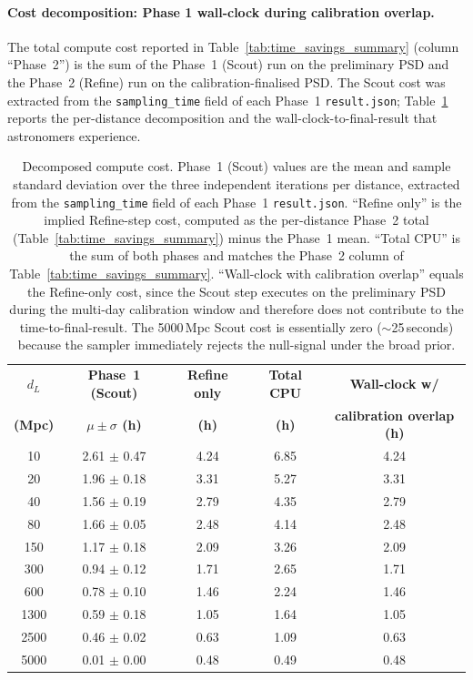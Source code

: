 \documentclass[12pt]{article}
\begin{document}
\paragraph{Cost decomposition: Phase 1 wall-clock during calibration overlap.}
The total compute cost reported in Table~\ref{tab:time_savings_summary} (column ``Phase~2'') is the sum of the Phase~1 (Scout) run on the preliminary PSD and the Phase~2 (Refine) run on the calibration-finalised PSD. The Scout cost was extracted from the \texttt{sampling\_time} field of each Phase~1 \texttt{result.json}; Table~\ref{tab:time_decomposition} reports the per-distance decomposition and the wall-clock-to-final-result that astronomers experience.

\begin{table}[htbp]
    \centering
    \begin{tabular}{c c c c c}
        \hline\hline
        \textbf{$d_L$} & \textbf{Phase~1 (Scout)} & \textbf{Refine only} & \textbf{Total CPU} & \textbf{Wall-clock w/} \\
        \textbf{(Mpc)} & \textbf{$\mu\pm\sigma$ (h)} & \textbf{(h)} & \textbf{(h)} & \textbf{calibration overlap (h)} \\
        \hline
        10   & 2.61 $\pm$ 0.47 & 4.24 & 6.85 & 4.24 \\
        20   & 1.96 $\pm$ 0.18 & 3.31 & 5.27 & 3.31 \\
        40   & 1.56 $\pm$ 0.19 & 2.79 & 4.35 & 2.79 \\
        80   & 1.66 $\pm$ 0.05 & 2.48 & 4.14 & 2.48 \\
        150  & 1.17 $\pm$ 0.18 & 2.09 & 3.26 & 2.09 \\
        300  & 0.94 $\pm$ 0.12 & 1.71 & 2.65 & 1.71 \\
        600  & 0.78 $\pm$ 0.10 & 1.46 & 2.24 & 1.46 \\
        1300 & 0.59 $\pm$ 0.18 & 1.05 & 1.64 & 1.05 \\
        2500 & 0.46 $\pm$ 0.02 & 0.63 & 1.09 & 0.63 \\
        5000 & 0.01 $\pm$ 0.00 & 0.48 & 0.49 & 0.48 \\
        \hline\hline
    \end{tabular}
    \caption[Decomposed compute cost (Scout $+$ Refine).]{Decomposed compute cost. Phase~1 (Scout) values are the mean and sample standard deviation over the three independent iterations per distance, extracted from the \texttt{sampling\_time} field of each Phase~1 \texttt{result.json}. ``Refine only'' is the implied Refine-step cost, computed as the per-distance Phase~2 total (Table~\ref{tab:time_savings_summary}) minus the Phase~1 mean. ``Total CPU'' is the sum of both phases and matches the Phase~2 column of Table~\ref{tab:time_savings_summary}. ``Wall-clock with calibration overlap'' equals the Refine-only cost, since the Scout step executes on the preliminary PSD during the multi-day calibration window \cite{Chaudhary2024,Sun2020} and therefore does not contribute to the time-to-final-result. The 5000\,Mpc Scout cost is essentially zero ($\sim$25\,seconds) because the sampler immediately rejects the null-signal under the broad prior.}
    \label{tab:time_decomposition}
\end{table}
\end{document}
